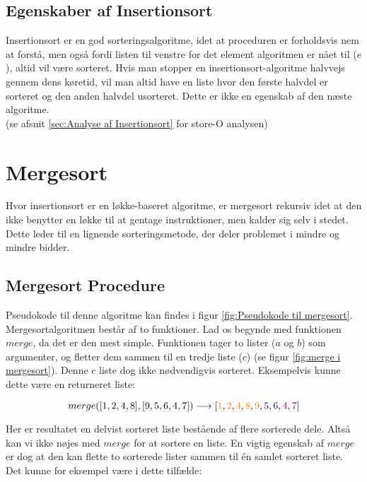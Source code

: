 \subsection{Egenskaber af Insertionsort}%
\label{sub:Egenskaber af Insertionsort}
Insertionsort er en god sorteringsalgoritme, idet at proceduren er forholdsvis nem at forstå, men også fordi listen til venstre for det element algoritmen er nået til ($e$), altid vil være sorteret. Hvis man stopper en insertionsort-algoritme halvvejs gennem dens køretid, vil man altid have en liste hvor den første halvdel er sorteret og den anden halvdel usorteret. Dette er ikke en egenskab af den næste algoritme.\\

(se afsnit \ref{sec:Analyse af Insertionsort} for store-O analysen)



\section{Mergesort}
\label{sec:Mergesort}

Hvor insertionsort er en løkke-baseret algoritme, er mergesort rekursiv idet at den ikke benytter en løkke til at gentage instruktioner, men kalder sig selv i stedet. Dette leder til en lignende sorteringsmetode, der deler problemet i mindre og mindre bidder. 

\subsection{Mergesort Procedure}%
\label{sub:Mergesort Procedure}

Pseudokode til denne algoritme kan findes i figur \ref{fig:Pseudokode til mergesort}.\\

Mergesortalgoritmen består af to funktioner. Lad os begynde med funktionen $merge$, da det er den mest simple. Funktionen tager to lister ($a$ og $b$) som argumenter, og fletter dem sammen til en tredje liste ($c$) (se figur \ref{fig:merge i mergesort}). Denne $c$ liste dog ikke nødvendigvis sorteret. Eksempelvis kunne dette være en returneret liste:

$$merge([1,2,4,8],[9,5,6,4,7]) \longrightarrow [\color{orange}1\color{black}, \color{orange}2\color{black}, \color{orange}4\color{black}, \color{orange}8\color{black}, \color{orange}9\color{black}, \color{blue}5\color{black}, \color{blue}6\color{black}, \color{violet}4\color{black}, \color{violet}7\color{black}]$$

Her er resultatet en delvist sorteret liste bestående af flere sorterede dele. Altså kan vi ikke nøjes med $merge$ for at sortere en liste. En vigtig egenskab af $merge$ er dog at den kan flette to sorterede lister sammen til én samlet sorteret liste. Det kunne for eksempel være i dette tilfælde:

